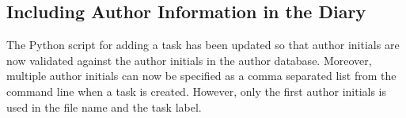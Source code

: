 \subsection{Including Author Information in the Diary}
\label{task:20140820_jkn0} 
The Python script for adding a task has been updated so that author initials are now validated against the author initials in the author database. Moreover, multiple author initials can now be specified as a comma separated list from the command line when a task is created. However, only the first author initials is used in the file name and the task label.

